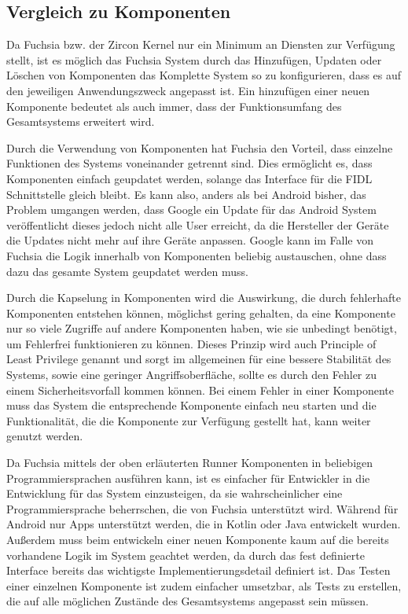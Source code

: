 \documentclass[a4paper]{scrartcl}
\begin{document}
\subsection{Vergleich zu Komponenten}
Da Fuchsia bzw. der Zircon Kernel nur ein Minimum an Diensten zur Verfügung stellt, ist es möglich das Fuchsia System durch das Hinzufügen, Updaten oder Löschen von Komponenten das Komplette System so zu konfigurieren, dass es auf den jeweiligen Anwendungszweck angepasst ist. Ein hinzufügen einer neuen Komponente bedeutet als auch immer, dass der Funktionsumfang des Gesamtsystems erweitert wird.

Durch die Verwendung von Komponenten hat Fuchsia den Vorteil, dass einzelne Funktionen des Systems voneinander getrennt sind. Dies ermöglicht es, dass Komponenten einfach geupdatet werden, solange das Interface für die FIDL Schnittstelle gleich bleibt. Es kann also, anders als bei Android bisher, das Problem umgangen werden, dass Google ein Update für das Android System veröffentlicht dieses jedoch nicht alle User erreicht, da die Hersteller der Geräte die Updates nicht mehr auf ihre Geräte anpassen. Google kann im Falle von Fuchsia die Logik innerhalb von Komponenten beliebig austauschen, ohne dass dazu das gesamte System geupdatet werden muss.

Durch die Kapselung in Komponenten wird die Auswirkung, die durch fehlerhafte Komponenten entstehen können, möglichst gering gehalten, da eine Komponente nur so viele Zugriffe auf andere Komponenten haben, wie sie unbedingt benötigt, um Fehlerfrei funktionieren zu können. Dieses Prinzip wird auch Principle of Least Privilege genannt und sorgt im allgemeinen für eine bessere Stabilität des Systems, sowie eine geringer Angriffsoberfläche, sollte es durch den Fehler zu einem Sicherheitsvorfall kommen können.\cite{Android.Security.PoLP} Bei einem Fehler in einer Komponente muss das System die entsprechende Komponente einfach neu starten und die Funktionalität, die die Komponente zur Verfügung gestellt hat, kann weiter genutzt werden.

Da Fuchsia mittels der oben erläuterten Runner Komponenten in beliebigen Programmiersprachen ausführen kann, ist es einfacher für Entwickler in die Entwicklung für das System einzusteigen, da sie wahrscheinlicher eine Programmiersprache beherrschen, die von Fuchsia unterstützt wird. Während für Android nur Apps unterstützt werden, die in Kotlin oder Java entwickelt wurden. Außerdem muss beim entwickeln einer neuen Komponente kaum auf die bereits vorhandene Logik im System geachtet werden, da durch das fest definierte Interface bereits das wichtigste Implementierungsdetail definiert ist. Das Testen einer einzelnen Komponente ist zudem einfacher umsetzbar, als Tests zu erstellen, die auf alle möglichen Zustände des Gesamtsystems angepasst sein müssen.
\end{document}
